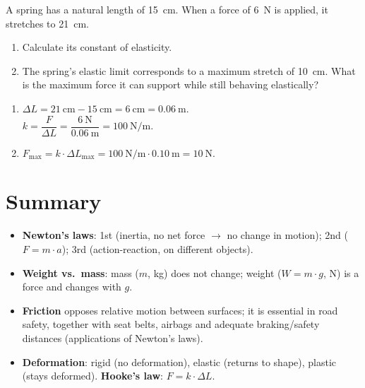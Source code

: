 \begin{exercise}
    A spring has a natural length of \qty{15}{\cm}. When a force of \qty{6}{\newton} is applied, it stretches to \qty{21}{\cm}.
    \begin{enumerate}[label=\letraminuscula]
        \item Calculate its constant of elasticity.
        \item The spring's elastic limit corresponds to a maximum stretch of \qty{10}{\cm}. What is the maximum force it can support while still behaving elastically?
    \end{enumerate}
    \begin{solu}
        \begin{enumerate}[label=\alph*)]
            \item \(\Delta L = \qty{21}{\cm} - \qty{15}{\cm} = \qty{6}{\cm} = \qty{0.06}{\m}\). \\
            \(k = \dfrac{F}{\Delta L} = \dfrac{\qty{6}{\newton}}{\qty{0.06}{\m}} = \qty{100}{\newton\per\metre}\).
            \item \(F_{\text{max}} = k \cdot \Delta L_{\text{max}} = \qty{100}{\newton\per\metre} \cdot \qty{0.10}{\m} = \qty{10}{\newton}\).
        \end{enumerate}
    \end{solu}
\end{exercise}



\section*{Summary}

\begin{itemize}
    \item \textbf{Newton's laws}: 1st (inertia, no net force \(\to\) no change in motion); 2nd (\(F = m \cdot a\)); 3rd (action-reaction, on different objects).
    \item \textbf{Weight vs.\ mass}: mass (\(m\), kg) does not change; weight (\(W = m \cdot g\), N) is a force and changes with \(g\).
    \item \textbf{Friction} opposes relative motion between surfaces; it is essential in road safety, together with seat belts, airbags and adequate braking/safety distances (applications of Newton's laws).
    \item \textbf{Deformation}: rigid (no deformation), elastic (returns to shape), plastic (stays deformed). \textbf{Hooke's law}: \(F = k \cdot \Delta L\).
\end{itemize}

